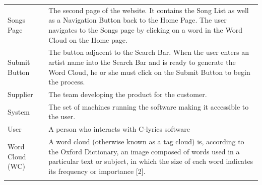 \documentclass[]{article}
\begin{document}
\begin{longtable}[c]{@{}ll@{}}
\begin{minipage}[t]{0.47\columnwidth}\raggedright
Songs Page
\end{minipage} & \begin{minipage}[t]{0.47\columnwidth}\raggedright
The second page of the website. It contains the Song List as well as a
Navigation Button back to the Home Page. The user navigates to the Songs
page by clicking on a word in the Word Cloud on the Home page.
\end{minipage}
\\\addlinespace
\begin{minipage}[t]{0.47\columnwidth}\raggedright
Submit Button
\end{minipage} & \begin{minipage}[t]{0.47\columnwidth}\raggedright
The button adjacent to the Search Bar. When the user enters an artist
name into the Search Bar and is ready to generate the Word Cloud, he or
she must click on the Submit Button to begin the process.
\end{minipage}
\\\addlinespace
\begin{minipage}[t]{0.47\columnwidth}\raggedright
Supplier
\end{minipage} & \begin{minipage}[t]{0.47\columnwidth}\raggedright
The team developing the product for the customer.
\end{minipage}
\\\addlinespace
\begin{minipage}[t]{0.47\columnwidth}\raggedright
System
\end{minipage} & \begin{minipage}[t]{0.47\columnwidth}\raggedright
The set of machines running the software making it accessible to the
user.
\end{minipage}
\\\addlinespace
\begin{minipage}[t]{0.47\columnwidth}\raggedright
User
\end{minipage} & \begin{minipage}[t]{0.47\columnwidth}\raggedright
A person who interacts with C-lyrics software
\end{minipage}
\\\addlinespace
\begin{minipage}[t]{0.47\columnwidth}\raggedright
Word Cloud (WC)
\end{minipage} & \begin{minipage}[t]{0.47\columnwidth}\raggedright
A word cloud (otherwise known as a tag cloud) is, according to the
Oxford Dictionary, an image composed of words used in a particular text
or subject, in which the size of each word indicates its frequency or
importance {[}2{]}.
\end{minipage}
\\\addlinespace
\bottomrule
\end{longtable}
\end{document}
